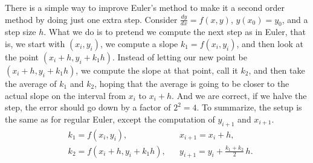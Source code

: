 \documentclass{ximera}
\begin{document}
There is a simple way to improve Euler's method to make it a second order method by doing just one extra step. Consider $\frac{dy}{dx}=f(x,y)$, $y(x_0) = y_0$, and a step size $h$. What we do is to pretend we compute the next step as in Euler, that is, we start with $(x_i,y_i)$, we compute a slope $k_1 = f(x_i,y_i)$, and then look at the point $(x_i+h,y_i + k_1h)$. Instead of letting our new point be $(x_i+h,y_i + k_1h)$, we compute the slope at that point, call it $k_2$, and then take the average of $k_1$ and $k_2$, hoping that the average is going to be closer to the actual slope on the interval from $x_i$ to $x_i+h$.  And we are correct, if we halve the step, the error should go down by a factor of $2^2 = 4$. To summarize, the setup is the same as for regular Euler, except the computation of $y_{i+1}$ and $x_{i+1}$.
\begin{align*}
    & k_1 = f(x_i,y_i) , & & 
    x_{i+1} = x_i + h , \\
    & k_2 = f(x_i + h,y_i + k_1h) ,
    & & y_{i+1} = y_i + \frac{k_1+k_2}{2}\,h .
\end{align*}
\end{document}
